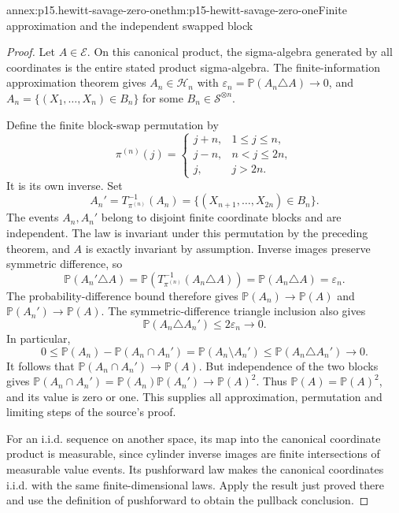\begin{annexitem}{annex:p15.hewitt-savage-zero-one}{thm:p15-hewitt-savage-zero-one}{Finite approximation and the independent swapped block}
\begin{proof}
Let \(A\in\mathcal E\). On this canonical product, the
sigma-algebra generated by all coordinates is the entire stated
product sigma-algebra. The finite-information approximation theorem
gives \(A_n\in\mathcal H_n\) with
\(\varepsilon_n=\mathbb P(A_n\triangle A)\to0\), and
\(A_n=\{(X_1,\ldots,X_n)\in B_n\}\) for some
\(B_n\in\mathcal S^{\otimes n}\).

Define the finite block-swap permutation by
\[
 \pi^{(n)}(j)=\begin{cases}
 j+n,&1\leq j\leq n,\\
 j-n,&n<j\leq2n,\\
 j,&j>2n.
 \end{cases}
\]
It is its own inverse. Set
\[
 A_n'=T_{\pi^{(n)}}^{-1}(A_n)
        =\{(X_{n+1},\ldots,X_{2n})\in B_n\}.
\]
The events \(A_n,A_n'\) belong to disjoint finite coordinate
blocks and are independent. The law is invariant under this
permutation by the preceding theorem, and \(A\) is exactly
invariant by assumption. Inverse images preserve symmetric
difference, so
\[
 \mathbb P(A_n'\triangle A)
   =\mathbb P(T_{\pi^{(n)}}^{-1}(A_n\triangle A))
   =\mathbb P(A_n\triangle A)=\varepsilon_n.
\]
The probability-difference bound therefore gives
\(\mathbb P(A_n)\to\mathbb P(A)\) and
\(\mathbb P(A_n')\to\mathbb P(A)\).
The symmetric-difference triangle inclusion also gives
\[
 \mathbb P(A_n\triangle A_n')\leq2\varepsilon_n\to0.
\]
In particular,
\[
 0\leq\mathbb P(A_n)-\mathbb P(A_n\cap A_n')
     =\mathbb P(A_n\setminus A_n')
     \leq\mathbb P(A_n\triangle A_n')\to0.
\]
It follows that \(\mathbb P(A_n\cap A_n')\to\mathbb P(A)\).
But independence of the two blocks gives
\(\mathbb P(A_n\cap A_n')=\mathbb P(A_n)\mathbb P(A_n')
\to\mathbb P(A)^2\). Thus \(\mathbb P(A)=\mathbb P(A)^2\),
and its value is zero or one. This supplies all approximation,
permutation and limiting steps of the source's proof.

For an i.i.d. sequence on another space, its map into the
canonical coordinate product is measurable, since cylinder
inverse images are finite intersections of measurable value
events. Its pushforward law makes the canonical coordinates
i.i.d. with the same finite-dimensional laws. Apply the result
just proved there and use the definition of pushforward to
obtain the pullback conclusion.
\end{proof}
\end{annexitem}

